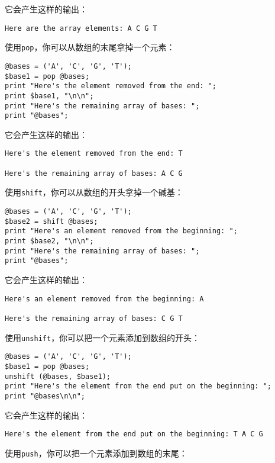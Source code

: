 它会产生这样的输出：

\begin{lstlisting}
Here are the array elements: A C G T
\end{lstlisting}

使用\verb|pop|，你可以从数组的末尾拿掉一个元素：

\begin{lstlisting}
@bases = ('A', 'C', 'G', 'T');
$base1 = pop @bases;
print "Here's the element removed from the end: ";
print $base1, "\n\n";
print "Here's the remaining array of bases: ";
print "@bases";
\end{lstlisting}

它会产生这样的输出：

\begin{lstlisting}
Here's the element removed from the end: T

Here's the remaining array of bases: A C G
\end{lstlisting}

使用\verb|shift|，你可以从数组的开头拿掉一个碱基：

\begin{lstlisting}
@bases = ('A', 'C', 'G', 'T');
$base2 = shift @bases;
print "Here's an element removed from the beginning: ";
print $base2, "\n\n";
print "Here's the remaining array of bases: ";
print "@bases";
\end{lstlisting}

它会产生这样的输出：

\begin{lstlisting}
Here's an element removed from the beginning: A

Here's the remaining array of bases: C G T
\end{lstlisting}

使用\verb|unshift|，你可以把一个元素添加到数组的开头：

\begin{lstlisting}
@bases = ('A', 'C', 'G', 'T');
$base1 = pop @bases;
unshift (@bases, $base1);
print "Here's the element from the end put on the beginning: ";
print "@bases\n\n";
\end{lstlisting}

它会产生这样的输出：

\begin{lstlisting}
Here's the element from the end put on the beginning: T A C G
\end{lstlisting}

使用\verb|push|，你可以把一个元素添加到数组的末尾：

